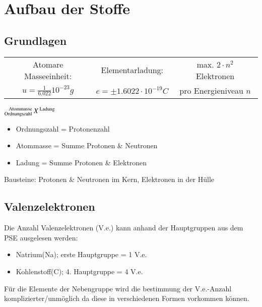 \section{Aufbau der Stoffe}

\subsection{Grundlagen}
\begin{center}
    \begin{tabular}{|c|c|c|}\hline
        Atomare Masseeinheit:               & Elementarladung:         & max. $2 \cdot n^{2}$ Elektronen \\ 
        $u = \frac{1}{6.022}10^{-23}g$      & $e = \pm 1.6022 \cdot 10^{-19}C$ & pro Energieniveau $n$ \\ \hline
    \end{tabular}
\end{center}


\begin{minipage}{0.25\linewidth}
    $ \prescript{\text{Atommasse }}{\text{Ordnungszahl }}{X}^{\text{ Ladung}} $
\end{minipage}
\hfill
\begin{minipage}{0.65\linewidth}
    \begin{itemize}[itemsep=1pt, parsep=0pt]
        \item Ordnungszahl = Protonenzahl
        \item Atommasse = Summe Protonen \& Neutronen
        \item Ladung = Summe Protonen \& Elektronen
    \end{itemize}
\end{minipage}

Bausteine: Protonen \& Neutronen im Kern, Elektronen in der Hülle

\subsection{Valenzelektronen}
Die Anzahl Valenzelektronen (V.e.) kann anhand der Hauptgruppen aus dem PSE ausgelesen werden:
\begin{itemize}
    \item Natrium(Na); erste Hauptgruppe = 1 V.e.
    \item Kohlenstoff(C); 4. Hauptgruppe = 4 V.e.
\end{itemize}  
Für die Elemente der Nebengruppe wird die bestimmung der V.e.-Anzahl komplizierter/unmöglich da diese in verschiedenen Formen vorkommen können.

